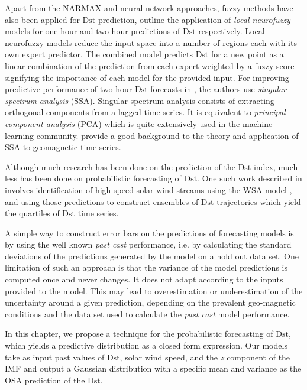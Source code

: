 Apart from the NARMAX and neural network approaches, fuzzy methods have also been applied for 
$\mathrm{Dst}$ prediction, \citet{Sharifi2006} outline the application of \emph{local neurofuzzy} 
models for one hour and two hour predictions of $\mathrm{Dst}$ respectively. Local neurofuzzy 
models reduce the input space into a number of regions each with its own expert predictor. 
The combined model predicts $\mathrm{Dst}$ for a new point as a linear combination of the 
prediction from each expert weighted by a fuzzy score signifying the importance of each model for 
the provided input. For improving predictive performance of two hour $\mathrm{Dst}$ forecasts in 
\citet{Sharifi2006}, the authors use \emph{singular spectrum analysis} (SSA). Singular spectrum 
analysis consists of extracting orthogonal components from a lagged time series. It is equivalent 
to \emph{principal component analysis} (PCA) which is quite extensively used in the machine 
learning community. \citet{loskutov2001testing,loskutov2001study} provide a good background to the 
theory and application of SSA to geomagnetic time series.

Although much research has been done on the prediction of the $\mathrm{Dst}$ index, much less has 
been done on probabilistic forecasting of $\mathrm{Dst}$. One such work described in 
\citet{McPherron:2013} involves identification of high speed solar wind streams using the WSA model 
\citep{WSAModel}, and using those predictions to construct ensembles of $\mathrm{Dst}$ 
trajectories which yield the quartiles of $\mathrm{Dst}$ time series. 

A simple way to construct error bars on the predictions of forecasting models is by using the well 
known \textit{past cast} performance, i.e. by calculating the standard deviations of the predictions 
generated by the model on a hold out data set. One limitation of such an approach is that the 
variance of the model predictions is computed once and never changes. It does not adapt according 
to the inputs provided to the model. This may lead to overestimation or underestimation of the 
uncertainty around a given prediction, depending on the prevalent geo-magnetic conditions and the 
data set used to calculate the \textit{past cast} model performance.

In this chapter, we propose a technique for the probabilistic forecasting of $\mathrm{Dst}$, which 
yields a predictive distribution as a closed form expression. Our models take as input past values 
of $\mathrm{Dst}$, solar wind speed, and the \textit{z} component of the IMF and output a 
Gaussian distribution with a specific mean and variance as the OSA prediction of the $\mathrm{Dst}$. 

